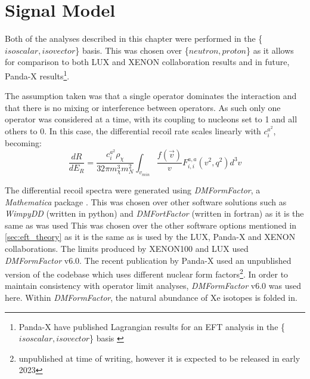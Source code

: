 \section{Signal Model}
\label{sec:eft_signal_models}
\par
Both of the analyses described in this chapter were performed in the \{$isoscalar,isovector$\} basis.
This was chosen over \{$neutron,proton$\} as it allows for comparison to both LUX and XENON collaboration results and in future, Panda-X results\footnote{Panda-X have published Lagrangian results for an EFT analysis in the \{$isoscalar,isovector$\} basis \cite{pandax_2_eft_ref}}.


\par
The assumption taken was that a single operator dominates the interaction and that there is no mixing or interference between operators.
As such only one operator was considered at a time, with its coupling to nucleons set to 1 and all others to 0.
In this case, the differential recoil rate scales linearly with $c^{a^2}_i$, becoming:
\begin{equation}
    \frac{dR}{dE_R} = \frac{c^{a^2}_i \rho_\chi}{32 \pi m^3_\chi m^2_N} \int_{v_{min}} \frac{f(\vec{v})}{v} F^{a,a}_{i,i} (v^2, q^2) d^3 v
\end{equation}


\par
The differential recoil spectra were generated using \textit{DMFormFactor}, a \textit{Mathematica} package \cite{dmformfactor_ref}.
This was chosen over other software solutions such as \textit{WimpyDD} (written in python) \cite{wimpydd_ref} and \textit{DMFortFactor} (written in fortran) \cite{dmfortfactor_ref} as it is the same as was used 
This was chosen over the other software options mentioned in \autoref{sec:eft_theory} as it is the same as is used by the LUX, Panda-X and XENON collaborations.
The limits produced by XENON100 \cite{xenon100_eft_ref} and LUX \cite{LUX_RUN4_EFT_2021} used \textit{DMFormFactor} v6.0.
The recent publication by Panda-X \cite{pandax_2_eft_ref} used an unpublished version of the codebase which uses different nuclear form factors\footnote{unpublished at time of writing, however it is expected to be released in early 2023}.
In order to maintain consistency with operator limit analyses, \textit{DMFormFactor} v6.0 was used here.
Within \textit{DMFormFactor}, the natural abundance of Xe isotopes is folded in.



